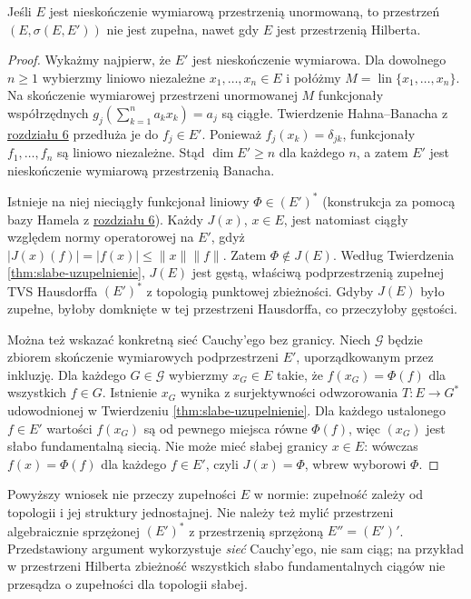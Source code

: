 \begin{wniosek}
\label{cor:slabe-niezupełne}
Jeśli $E$ jest nieskończenie wymiarową przestrzenią
unormowaną, to przestrzeń $(E,\sigma(E,E'))$ nie jest
zupełna, nawet gdy $E$ jest przestrzenią Hilberta.
\end{wniosek}
\begin{proof}
Wykażmy najpierw, że $E'$ jest nieskończenie wymiarowa.
Dla dowolnego $n\ge1$ wybierzmy liniowo niezależne
$x_1,\ldots,x_n\in E$ i połóżmy
$M=\operatorname{lin}\{x_1,\ldots,x_n\}$.
Na skończenie wymiarowej przestrzeni unormowanej $M$
funkcjonały współrzędnych
$g_j(\sum_{k=1}^n a_kx_k)=a_j$ są ciągłe.
Twierdzenie Hahna--Banacha z \hyperref[sec:hahn-banach]{rozdziału 6}
przedłuża je do $f_j\in E'$.
Ponieważ $f_j(x_k)=\delta_{jk}$, funkcjonały
$f_1,\ldots,f_n$ są liniowo niezależne.
Stąd $\dim E'\ge n$ dla każdego $n$, a zatem
$E'$ jest nieskończenie wymiarową przestrzenią Banacha.

Istnieje na niej nieciągły funkcjonał liniowy
$\Phi\in(E')^*$ (konstrukcja za pomocą bazy Hamela
z \hyperref[sec:hahn-banach]{rozdziału 6}).
Każdy $J(x)$, $x\in E$, jest natomiast ciągły względem normy
operatorowej na $E'$, gdyż
$|J(x)(f)|=|f(x)|\le\|x\|\|f\|$.
Zatem $\Phi\notin J(E)$. Według Twierdzenia
\ref{thm:slabe-uzupelnienie}, $J(E)$ jest gęstą,
właściwą podprzestrzenią zupełnej TVS Hausdorffa
$(E')^*$ z topologią punktowej zbieżności.
Gdyby $J(E)$ było zupełne, byłoby domknięte
w tej przestrzeni Hausdorffa, co przeczyłoby gęstości.

Można też wskazać konkretną sieć Cauchy'ego bez granicy.
Niech $\mathcal G$ będzie zbiorem skończenie wymiarowych
podprzestrzeni $E'$, uporządkowanym przez inkluzję.
Dla każdego $G\in\mathcal G$ wybierzmy $x_G\in E$
takie, że $f(x_G)=\Phi(f)$ dla wszystkich $f\in G$.
Istnienie $x_G$ wynika z surjektywności odwzorowania
$T:E\to G^*$ udowodnionej w Twierdzeniu
\ref{thm:slabe-uzupelnienie}. Dla każdego ustalonego
$f\in E'$ wartości $f(x_G)$ są od pewnego miejsca
równe $\Phi(f)$, więc $(x_G)$ jest słabo fundamentalną
siecią. Nie może mieć słabej granicy $x\in E$:
wówczas $f(x)=\Phi(f)$ dla każdego $f\in E'$,
czyli $J(x)=\Phi$, wbrew wyborowi $\Phi$.
\end{proof}

\begin{uwaga}
Powyższy wniosek nie przeczy zupełności $E$ w normie:
zupełność zależy od topologii i jej struktury jednostajnej.
Nie należy też mylić przestrzeni algebraicznie sprzężonej
$(E')^*$ z przestrzenią sprzężoną $E''=(E')'$.
Przedstawiony argument wykorzystuje \emph{sieć} Cauchy'ego,
nie sam ciąg; na przykład w przestrzeni Hilberta zbieżność
wszystkich słabo fundamentalnych ciągów nie przesądza
o zupełności dla topologii słabej.
\end{uwaga}

